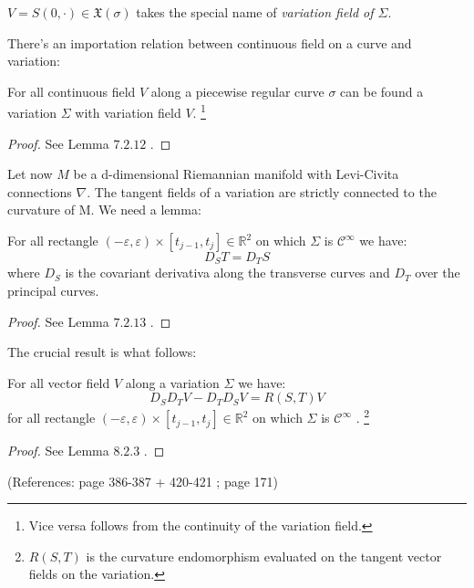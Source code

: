 \documentclass[a4paper,12pt]{scrartcl}    %
\begin{document}
\begin{notationfix}
 $V= S(0,\cdot) \in \mathfrak{X}(\sigma)$ takes the special name of \emph{variation field of $\Sigma$}.
\end{notationfix}

There's an importation relation between continuous field on a curve and variation:
\begin{proposition}
 For all continuous field $V$ along a piecewise regular curve $\sigma$ can be found a variation 
 $\Sigma$ with variation field $V$.
 \footnote{Vice versa follows from the continuity of the variation field.}
\end{proposition}
\begin{proof}
 See \cite{Abate2011} Lemma $7.2.12$ .
\end{proof}

\vspace{8mm}
Let now $M$ be a d-dimensional Riemannian manifold with Levi-Civita connections $\nabla$.
The tangent fields of a variation are strictly connected to the curvature of M.
We need a lemma:

\begin{lemma}
 For all rectangle $(-\varepsilon,\varepsilon) \times [t_{j-1}, t_j] \in \mathbb{R}^2$ 
 on which $\Sigma$ is $\mathcal{C}^{\infty}$ we have:
 \begin{displaymath}
   D_S T = D_T S
 \end{displaymath}
 where $D_S$ is the covariant derivativa along the transverse curves and $D_T$ over the principal curves.
\end{lemma}
\begin{proof}
 See \cite{Abate2011} Lemma $7.2.13$ .
\end{proof}
The crucial result is what follows:
\begin{proposition}
 For all vector field $V$ along a variation $\Sigma$ we have:
 \begin{displaymath}
   D_S D_T V - D_T D_S V = R( S, T) V
 \end{displaymath}
 for all rectangle $(-\varepsilon,\varepsilon) \times [t_{j-1}, t_j] \in \mathbb{R}^2$ on which $\Sigma$ is $\mathcal{C}^{\infty}$ .
 \footnote{$ R(S, T)$ is the curvature endomorphism evaluated on the tangent vector fields on the variation.}
\end{proposition}
\begin{proof}
 See \cite{Abate2011} Lemma $8.2.3$ .
\end{proof}

 (References: \cite{Abate2011} page 386-387 + 420-421 ; \cite{Jost2005} page 171)
\end{document}
